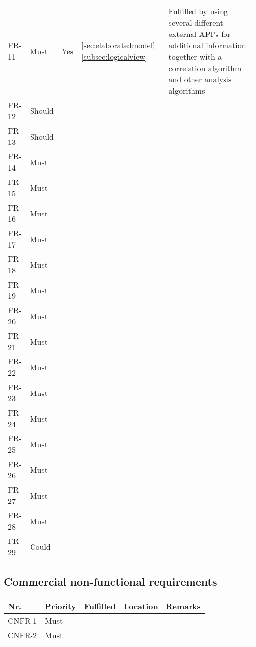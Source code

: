\begin{table}[H]
\begin{tabular}{lllll}
		FR-11 & Must     & Yes & \ref{sec:elaboratedmodel} \ref{subsec:logicalview}  & Fulfilled by using several different external API's for additional information together with a correlation algorithm and other analysis algorithms \\ 
		FR-12 & Should   & ~        & ~         & ~       \\ 
		FR-13 & Should   & ~        & ~         & ~       \\ 
		FR-14 & Must     & ~        & ~         & ~       \\ 
		FR-15 & Must     & ~        & ~         & ~       \\ 
		FR-16 & Must     & ~        & ~         & ~       \\ 
		FR-17 & Must     & ~        & ~         & ~       \\ 
		FR-18 & Must     & ~        & ~         & ~       \\ 
		FR-19 & Must     & ~        & ~         & ~       \\ 
		FR-20 & Must     & ~        & ~         & ~       \\ 
		FR-21 & Must     & ~        & ~         & ~       \\ 
		FR-22 & Must     & ~        & ~         & ~       \\ 
		FR-23 & Must     & ~        & ~         & ~       \\ 
		FR-24 & Must     & ~        & ~         & ~       \\ 
		FR-25 & Must     & ~        & ~         & ~       \\ 
		FR-26 & Must     & ~        & ~         & ~       \\ 
		FR-27 & Must     & ~        & ~         & ~       \\ 
		FR-28 & Must     & ~        & ~         & ~       \\ 
		FR-29 & Could    & ~        & ~         & ~       \\
						
	\end{tabular}
\end{table}

\subsection{Commercial non-functional requirements}
\begin{table}[H]
	\begin{tabular}{lllll}
						    
		Nr.    & Priority & Fulfilled & Location & Remarks \\ \hline
		CNFR-1 & Must     & ~        & ~         & ~       \\ 
		CNFR-2 & Must     & ~        & ~         & ~       \\
						
	\end{tabular}
\end{table}

